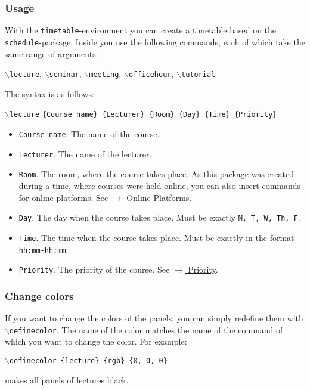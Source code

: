 \documentclass[english]{article}
\newcommand{\cmd}[1]{$\backslash$\texttt{{#1}}}
\begin{document}
	\subsubsection{Usage}
	With the \texttt{timetable}-environment you can create a timetable based on the \texttt{schedule}-package.
	Inside you use the following commands, each of which take the same range of arguments:
	\begin{center}
		\cmd{lecture}, \cmd{seminar}, \cmd{meeting}, \cmd{officehour}, \cmd{tutorial}
	\end{center}
	The syntax is as follows:
	\begin{center}
		\cmd{lecture} \texttt{\{Course name\} \{Lecturer\} \{Room\} \{Day\} \{Time\} \{Priority\}}
	\end{center}
	\begin{itemize}
		\item \texttt{Course name}.
		The name of the course.
		
		\item \texttt{Lecturer}.
		The name of the lecturer.
		
		\item \texttt{Room}.
		The room, where the course takes place. As this package was created during a time, where courses were held online, you can also insert commands for online platforms. See \hyperref[online]{$\rightarrow$ Online Platforms}.
		
		\item \texttt{Day}.
		The day when the course takes place. Must be exactly \texttt{M, T, W, Th, F}.
		
		\item \texttt{Time}.
		The time when the course takes place. Must be exactly in the format \texttt{hh:mm-hh:mm}.
		
		\item \texttt{Priority}.
		The priority of the course. See \hyperref[priority]{$\rightarrow$ Priority}.
	\end{itemize}
	\subsubsection{Change colors}
	If you want to change the colors of the panels, you can simply redefine them with \cmd{definecolor}. The name of the color matches the name of the command of which you want to change the color. For example:
	\begin{center}
		\cmd{definecolor \{lecture\} \{rgb\} \{0, 0, 0\}}
	\end{center}
	makes all panels of lectures black.
	
\end{document}
